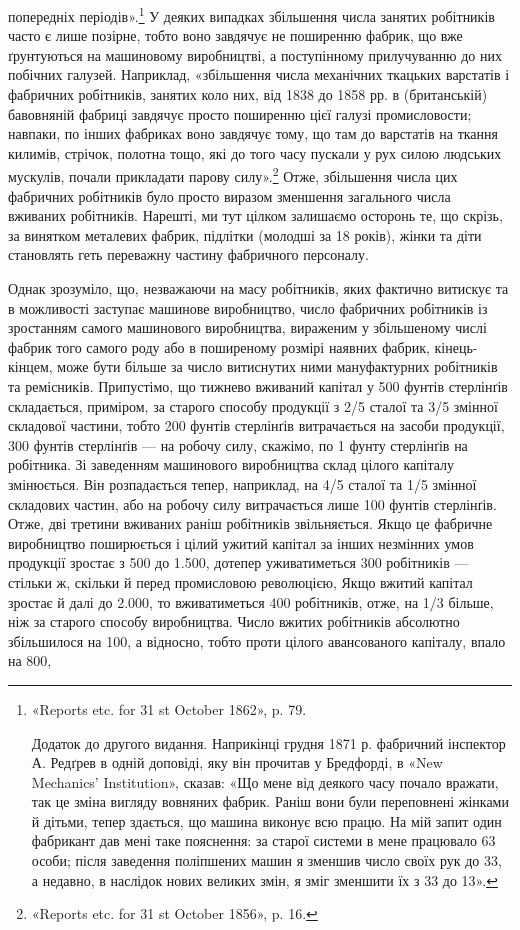 попередніх періодів».\footnote{
«Reports etc. for 31 st October 1862», p. 79.

Додаток до другого видання. Наприкінці грудня 1871 р. фабричний
інспектор А. Редґрев в одній доповіді, яку він прочитав у Бредфорді, в
«New Mechanics’ Institution», сказав: «Що мене від деякого часу почало
вражати, так це зміна вигляду вовняних фабрик. Раніш вони були переповнені
жінками й дітьми, тепер здається, що машина виконує всю працю.
На мій запит один фабрикант дав мені таке пояснення: за старої системи в
мене працювало 63 особи; після заведення поліпшених машин я зменшив
число своїх рук до 33, а недавно, в наслідок нових великих змін, я зміг
зменшити їх з 33 до 13».
} У деяких випадках збільшення числа
занятих робітників часто є лише позірне, тобто воно завдячує не
поширенню фабрик, що вже ґрунтуються на машиновому виробництві,
а поступінному прилучуванню до них побічних галузей.
Наприклад, «збільшення числа механічних ткацьких варстатів
і фабричних робітників, занятих коло них, від 1838 до 1858 рр.
в (британській) бавовняній фабриці завдячує просто поширенню
цієї галузі промисловости; навпаки, по інших фабриках воно
завдячує тому, що там до варстатів на ткання килимів, стрічок,
полотна тощо, які до того часу пускали у рух силою людських
мускулів, почали прикладати парову силу».\footnote{
«Reports etc. for 31 st October 1856», p. 16.
} Отже, збільшення
числа цих фабричних робітників було просто виразом зменшення
загального числа вживаних робітників. Нарешті, ми тут цілком
залишаємо осторонь те, що скрізь, за винятком металевих фабрик,
підлітки (молодші за 18 років), жінки та діти становлять геть
переважну частину фабричного персоналу.

Однак зрозуміло, що, незважаючи на масу робітників, яких фактично
витискує та в можливості заступає машинове виробництво,
число фабричних робітників із зростанням самого машинового виробництва,
вираженим у збільшеному числі фабрик того самого
роду або в поширеному розмірі наявних фабрик, кінець-кінцем,
може бути більше за число витиснутих ними мануфактурних робітників
та ремісників. Припустімо, що тижнево вживаний капітал
у 500 фунтів стерлінґів складається, приміром, за старого способу
продукції з 2/5 сталої та 3/5 змінної складової частини, тобто 200
фунтів стерлінґів витрачається на засоби продукції, 300 фунтів
стерлінґів — на робочу силу, скажімо, по 1 фунту стерлінґів
на робітника. Зі заведенням машинового виробництва склад цілого
капіталу змінюється. Він розпадається тепер, наприклад, на 4/5
сталої та 1/5 змінної складових частин, або на робочу силу витрачається
лише 100 фунтів стерлінґів. Отже, дві третини вживаних
раніш робітників звільняється. Якщо це фабричне виробництво
поширюється і цілий ужитий капітал за інших незмінних умов
продукції зростає з 500 до 1.500, дотепер уживатиметься 300 робітників
— стільки ж, скільки й перед промисловою революцією,
Якщо вжитий капітал зростає й далі до 2.000, то вживатиметься
400 робітників, отже, на 1/3 більше, ніж за старого способу виробництва.
Число вжитих робітників абсолютно збільшилося на 100,
а відносно, тобто проти цілого авансованого капіталу, впало на 800,